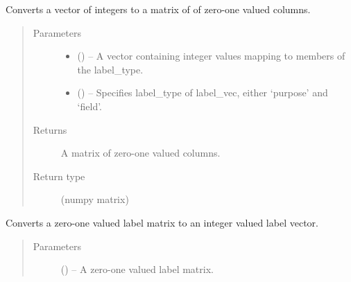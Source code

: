 \documentclass[letterpaper,10pt,english]{sphinxmanual}
\begin{document}
\begin{fulllineitems}
\label{\detokenize{KUHERD:KUHERD.LabelTransformations.label2mat}}
Converts a vector of integers to a matrix of of zero-one valued columns.
\begin{quote}\begin{description}
\item[{Parameters}] \leavevmode\begin{itemize}
\item {} 
 () -- A vector containing integer values mapping to members of the label\_type.

\item {} 
 () -- Specifies label\_type of label\_vec, either `purpose' and `field'.

\end{itemize}

\item[{Returns}] \leavevmode
A matrix of zero-one valued columns.

\item[{Return type}] \leavevmode
(numpy matrix)

\end{description}\end{quote}

\end{fulllineitems}


\begin{fulllineitems}
\label{\detokenize{KUHERD:KUHERD.LabelTransformations.mat2vec}}
Converts a zero-one valued label matrix to an integer valued label vector.
\begin{quote}\begin{description}
\item[{Parameters}] \leavevmode
{} () -- A zero-one valued label matrix.

\end{description}\end{quote}

\end{fulllineitems}
\end{document}
